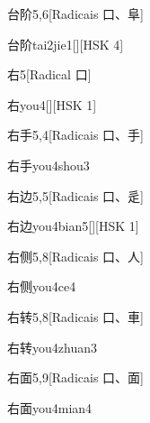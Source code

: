 \begin{entry}{台阶}{5,6}[Radicais ⼝、⾩]
  \begin{phonetics}{台阶}{tai2jie1}[][HSK 4]
  \end{phonetics}
\end{entry}

\begin{entry}{右}{5}[Radical ⼝]
  \begin{phonetics}{右}{you4}[][HSK 1]
  \end{phonetics}
\end{entry}

\begin{entry}{右手}{5,4}[Radicais ⼝、⼿]
  \begin{phonetics}{右手}{you4shou3}
  \end{phonetics}
\end{entry}

\begin{entry}{右边}{5,5}[Radicais ⼝、⾡]
  \begin{phonetics}{右边}{you4bian5}[][HSK 1]
  \end{phonetics}
\end{entry}

\begin{entry}{右侧}{5,8}[Radicais ⼝、⼈]
  \begin{phonetics}{右侧}{you4ce4}
  \end{phonetics}
\end{entry}

\begin{entry}{右转}{5,8}[Radicais ⼝、⾞]
  \begin{phonetics}{右转}{you4zhuan3}
  \end{phonetics}
\end{entry}

\begin{entry}{右面}{5,9}[Radicais ⼝、⾯]
  \begin{phonetics}{右面}{you4mian4}
  \end{phonetics}
\end{entry}

